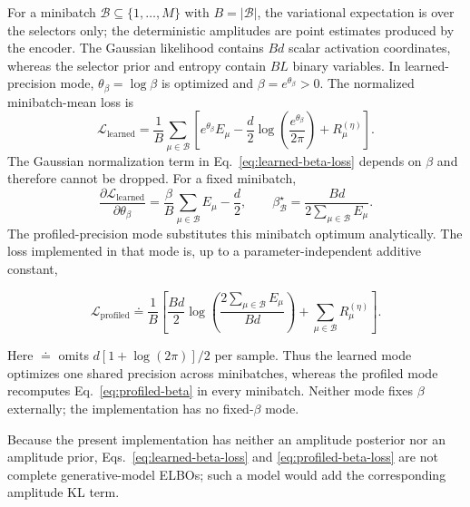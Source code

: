 \documentclass[aps,pre,reprint,superscriptaddress,amsmath,amssymb,nofootinbib]{revtex4-2}
\begin{document}
For a minibatch $\mathcal B\subseteq\{1,\ldots,M\}$ with
$B=|\mathcal B|$, the variational expectation is over the selectors only;
the deterministic amplitudes are point estimates produced by the encoder.
The Gaussian likelihood
contains $Bd$ scalar activation coordinates, whereas the selector prior and
entropy contain $BL$ binary variables.  In learned-precision
mode, $\theta_\beta=\log\beta$ is optimized and $\beta=e^{\theta_\beta}>0$.
The normalized minibatch-mean loss is
\begin{equation}
 \mathcal L_{\mathrm{learned}}
 =\frac1B\sum_{\mu\in\mathcal B}
 \left[
 e^{\theta_\beta}E_\mu
 -\frac d2\log\!\left(\frac{e^{\theta_\beta}}{2\pi}\right)
 +R_\mu^{(\eta)}
 \right].
 \label{eq:learned-beta-loss}
\end{equation}
The Gaussian normalization term in Eq.~\eqref{eq:learned-beta-loss} depends on
$\beta$ and therefore cannot be dropped.  For a fixed minibatch,
\begin{equation}
 \frac{\partial\mathcal L_{\mathrm{learned}}}{\partial\theta_\beta}
 =\frac{\beta}{B}\sum_{\mu\in\mathcal B}E_\mu-\frac d2,
 \qquad
 \beta_{\mathcal B}^\star
 =\frac{Bd}{2\sum_{\mu\in\mathcal B}E_\mu}.
 \label{eq:profiled-beta}
\end{equation}
The profiled-precision mode substitutes this minibatch optimum analytically.
The loss implemented in that mode is, up to a parameter-independent additive
constant,
\begin{widetext}
\begin{equation}
 \mathcal L_{\mathrm{profiled}}
 \doteq
 \frac1B\left[
 \frac{Bd}{2}\log\!\left(
 \frac{2\sum_{\mu\in\mathcal B}E_\mu}{Bd}
 \right)
 +\sum_{\mu\in\mathcal B}R_\mu^{(\eta)}
 \right].
 \label{eq:profiled-beta-loss}
\end{equation}
\end{widetext}
Here $\doteq$ omits $d[1+\log(2\pi)]/2$ per sample.  Thus the learned mode
optimizes one shared precision across minibatches, whereas the profiled mode
recomputes Eq.~\eqref{eq:profiled-beta} in every minibatch.  Neither mode fixes
$\beta$ externally; the implementation has no fixed-$\beta$ mode.

Because the present implementation has neither an amplitude posterior nor an
amplitude prior, Eqs.~\eqref{eq:learned-beta-loss} and
\eqref{eq:profiled-beta-loss} are not complete generative-model ELBOs; such a
model would add the corresponding amplitude KL term.
\end{document}
